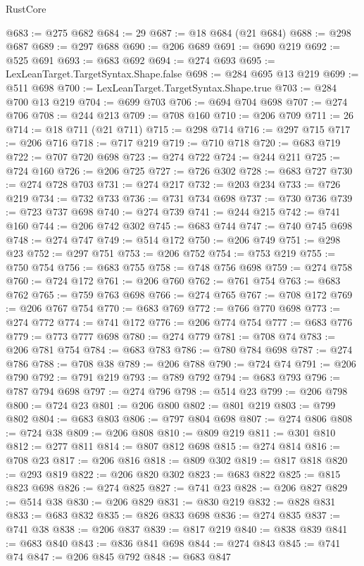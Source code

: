 \begin{lexlean}{RustCore}
\begin{coremodule}
@683 := @275 @682
@684 := 29
@687 := @18 @684 (@21 @684)
@688 := @298 @687
@689 := @297 @688
@690 := @206 @689
@691 := @690 @219
@692 := @525 @691
@693 := @683 @692
@694 := @274 @693
@695 := LexLeanTarget.TargetSyntax.Shape.false
@698 := @284 @695 @13 @219
@699 := @511 @698
@700 := LexLeanTarget.TargetSyntax.Shape.true
@703 := @284 @700 @13 @219
@704 := @699 @703
@706 := @694 @704 @698
@707 := @274 @706
@708 := @244 @213
@709 := @708 @160
@710 := @206 @709
@711 := 26
@714 := @18 @711 (@21 @711)
@715 := @298 @714
@716 := @297 @715
@717 := @206 @716
@718 := @717 @219
@719 := @710 @718
@720 := @683 @719
@722 := @707 @720 @698
@723 := @274 @722
@724 := @244 @211
@725 := @724 @160
@726 := @206 @725
@727 := @726 @302
@728 := @683 @727
@730 := @274 @728 @703
@731 := @274 @217
@732 := @203 @234
@733 := @726 @219
@734 := @732 @733
@736 := @731 @734 @698
@737 := @730 @736
@739 := @723 @737 @698
@740 := @274 @739
@741 := @244 @215
@742 := @741 @160
@744 := @206 @742 @302
@745 := @683 @744
@747 := @740 @745 @698
@748 := @274 @747
@749 := @514 @172
@750 := @206 @749
@751 := @298 @23
@752 := @297 @751
@753 := @206 @752
@754 := @753 @219
@755 := @750 @754
@756 := @683 @755
@758 := @748 @756 @698
@759 := @274 @758
@760 := @724 @172
@761 := @206 @760
@762 := @761 @754
@763 := @683 @762
@765 := @759 @763 @698
@766 := @274 @765
@767 := @708 @172
@769 := @206 @767 @754
@770 := @683 @769
@772 := @766 @770 @698
@773 := @274 @772
@774 := @741 @172
@776 := @206 @774 @754
@777 := @683 @776
@779 := @773 @777 @698
@780 := @274 @779
@781 := @708 @74
@783 := @206 @781 @754
@784 := @683 @783
@786 := @780 @784 @698
@787 := @274 @786
@788 := @708 @38
@789 := @206 @788
@790 := @724 @74
@791 := @206 @790
@792 := @791 @219
@793 := @789 @792
@794 := @683 @793
@796 := @787 @794 @698
@797 := @274 @796
@798 := @514 @23
@799 := @206 @798
@800 := @724 @23
@801 := @206 @800
@802 := @801 @219
@803 := @799 @802
@804 := @683 @803
@806 := @797 @804 @698
@807 := @274 @806
@808 := @724 @38
@809 := @206 @808
@810 := @809 @219
@811 := @301 @810
@812 := @277 @811
@814 := @807 @812 @698
@815 := @274 @814
@816 := @708 @23
@817 := @206 @816
@818 := @809 @302
@819 := @817 @818
@820 := @293 @819
@822 := @206 @820 @302
@823 := @683 @822
@825 := @815 @823 @698
@826 := @274 @825
@827 := @741 @23
@828 := @206 @827
@829 := @514 @38
@830 := @206 @829
@831 := @830 @219
@832 := @828 @831
@833 := @683 @832
@835 := @826 @833 @698
@836 := @274 @835
@837 := @741 @38
@838 := @206 @837
@839 := @817 @219
@840 := @838 @839
@841 := @683 @840
@843 := @836 @841 @698
@844 := @274 @843
@845 := @741 @74
@847 := @206 @845 @792
@848 := @683 @847

\end{coremodule}
\end{lexlean}
